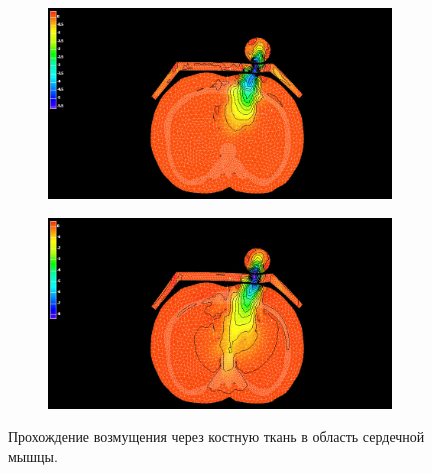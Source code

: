 \begin{figure}[h]
\centering
\begin{subfigure}[b]{0.9\textwidth}
\centering
\includegraphics[width=\textwidth]{png/cranium/chest-res-04.png}
\caption{ }
\end{subfigure}
\begin{subfigure}[b]{0.9\textwidth}
\centering
\includegraphics[width=\textwidth]{png/cranium/chest-res-05.png}
\caption{ }
\end{subfigure}
\caption{Прохождение возмущения через костную ткань в область сердечной мышцы.}
\end{figure}

